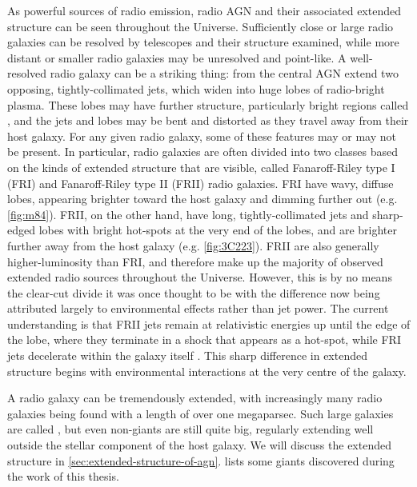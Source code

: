         As powerful sources of radio emission, radio AGN and their associated extended structure can be seen throughout the Universe. Sufficiently close or large radio galaxies can be resolved by telescopes and their structure examined, while more distant or smaller radio galaxies may be unresolved and point-like. A well-resolved radio galaxy can be a striking thing: from the central AGN extend two opposing, tightly-collimated jets, which widen into huge lobes of radio-bright plasma. These lobes may have further structure, particularly bright regions called , and the jets and lobes may be bent and distorted as they travel away from their host galaxy. For any given radio galaxy, some of these features may or may not be present. In particular, radio galaxies are often divided into two classes based on the kinds of extended structure that are visible, called Fanaroff-Riley type I (FRI) and Fanaroff-Riley type II (FRII) radio galaxies. FRI have wavy, diffuse lobes, appearing brighter toward the host galaxy and dimming further out (e.g. \autoref{fig:m84}). FRII, on the other hand, have long, tightly-collimated jets and sharp-edged lobes with bright hot-spots \citep{urry95unified} at the very end of the lobes, and are brighter further away from the host galaxy (e.g. \autoref{fig:3C223}). FRII are also generally higher-luminosity \citep{fanaroff1974} than FRI, and therefore make up the majority of observed extended radio sources throughout the Universe. However, this is by no means the clear-cut divide it was once thought to be \citep{mingo_revisiting_2019} with the difference now being attributed largely to environmental effects rather than jet power. The current understanding is that FRII jets remain at relativistic energies up until the edge of the lobe, where they terminate in a shock that appears as a hot-spot, while FRI jets decelerate within the galaxy itself \citep{hardcastle20feedback}. This sharp difference in extended structure begins with environmental interactions at the very centre of the galaxy.

        A radio galaxy can be tremendously extended, with increasingly many radio galaxies being found with a length of over one megaparsec. Such large galaxies are called , but even non-giants are still quite big, regularly extending well outside the stellar component of the host galaxy. We will discuss the extended structure in \autoref{sec:extended-structure-of-agn}.  lists some giants discovered during the work of this thesis.

